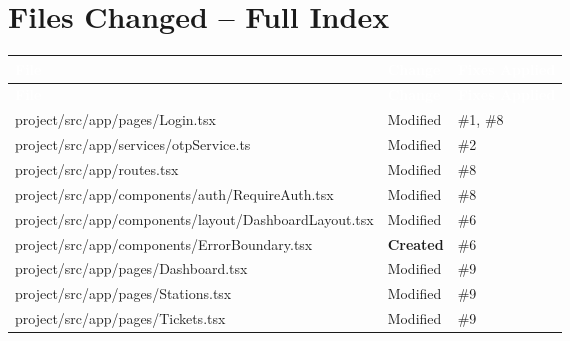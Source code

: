\documentclass[12pt,a4paper]{report}
\begin{document}
	\chapter{Files Changed -- Full Index}
	
	\setlength{\tabcolsep}{6pt}
	\renewcommand{\arraystretch}{1.4}
	
	\begin{longtable}{
			>{\ttfamily\small}p{7.8cm}
			p{2.2cm}
			p{3.2cm}
		}
		\rowcolor{tablehead}
		\normalfont\textcolor{white}{\textbf{File}} &
		\textcolor{white}{\textbf{Change}} &
		\textcolor{white}{\textbf{Fixes Applied}} \\
		\endfirsthead
		\rowcolor{tablehead}
		\normalfont\textcolor{white}{\textbf{File}} &
		\textcolor{white}{\textbf{Change}} &
		\textcolor{white}{\textbf{Fixes Applied}} \\
		\endhead
		\bottomrule
		\endfoot
		
		\rowcolor{rowalt}
		project/src/app/pages/Login.tsx &
		\textcolor{highorange}{Modified} & \#1, \#8 \\
		
		project/src/app/services/otpService.ts &
		\textcolor{highorange}{Modified} & \#2 \\
		
		\rowcolor{rowalt}
		project/src/app/routes.tsx &
		\textcolor{highorange}{Modified} & \#8 \\
		
		project/src/app/components/auth/RequireAuth.tsx &
		\textcolor{highorange}{Modified} & \#8 \\
		
		\rowcolor{rowalt}
		project/src/app/components/layout/DashboardLayout.tsx &
		\textcolor{highorange}{Modified} & \#6 \\
		
		project/src/app/components/ErrorBoundary.tsx &
		\textcolor{greenfg}{\textbf{Created}} & \#6 \\
		
		\rowcolor{rowalt}
		project/src/app/pages/Dashboard.tsx &
		\textcolor{highorange}{Modified} & \#9 \\
		
		project/src/app/pages/Stations.tsx &
		\textcolor{highorange}{Modified} & \#9 \\
		
		\rowcolor{rowalt}
		project/src/app/pages/Tickets.tsx &
		\textcolor{highorange}{Modified} & \#9 \\
		

\end{longtable}
\end{document}
